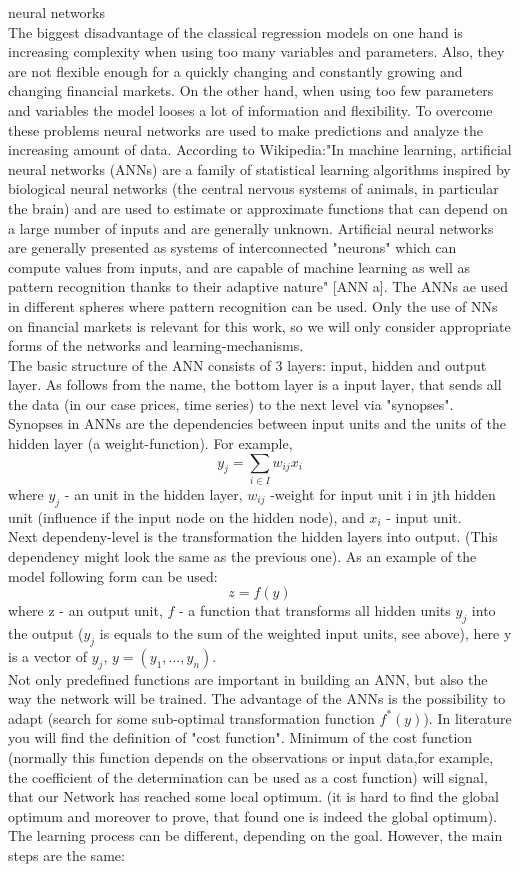 \documentclass[12pt, a4paper]{article}
\begin{document}
neural networks\\
The biggest disadvantage of the classical regression models on one hand  is increasing complexity when using too many variables and parameters. Also, they are not flexible enough for a quickly changing and constantly growing and changing financial markets. On the other hand, when using too few parameters and variables the model looses a lot of information and flexibility. To overcome these problems neural networks are used to make predictions and analyze the increasing amount of data. According to Wikipedia:"In machine learning, artificial neural networks (ANNs) are a family of statistical learning algorithms inspired by biological neural networks (the central nervous systems of animals, in particular the brain) and are used to estimate or approximate functions that can depend on a large number of inputs and are generally unknown. Artificial neural networks are generally presented as systems of interconnected "neurons" which can compute values from inputs, and are capable of machine learning as well as pattern recognition thanks to their adaptive nature" [ANN a]. The ANNs ae used in different spheres where pattern recognition can be used. Only the use of NNs on financial markets is relevant for this work, so we will only consider appropriate forms of the networks and learning-mechanisms.\\
The basic structure of the ANN consists of 3 layers: input, hidden and output layer. As follows from the name, the bottom layer is a input layer, that sends all the data (in our case prices, time series) to the next level via "synopses". Synopses in ANNs are the dependencies between input units and the units of the hidden layer (a weight-function). For example,
\[y_{j} = \sum_{i \in I}w_{ij}x_{i} \]
where $y_{j}$ - an unit in the hidden layer, $w_{ij}$ -weight for input unit i in jth hidden unit (influence if the input node on the hidden node), and $x_{i}$ - input unit.\\
Next dependeny-level is the transformation the hidden layers into output. (This dependency might look the same as the previous one). As an example of the model following form can be used:
\[z=f(y)\]
where z - an output unit, $f$ - a function that transforms all hidden units $y_{j}$ into the output ($y_{j}$ is equals to the sum of the weighted input units, see above), here y is a vector of $y_{j}$, $y=(y_{1},...,y_{n})$.\\
Not only predefined functions are important in building an ANN, but also the way the network will be trained. The advantage of the ANNs is the possibility to adapt (search for some sub-optimal transformation function $f^*(y)$). In literature you will find the definition of "cost function". Minimum of the cost function (normally this function depends on the observations or input data,for example, the coefficient of the determination can be used as a cost function) will signal, that our Network has reached some local optimum. (it is hard to find the global optimum and moreover to prove, that found one is indeed the global optimum). The learning process can be different, depending on the goal. However, the main steps are the same:\\
\end{document}

